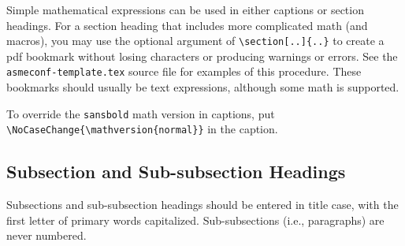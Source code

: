 \documentclass[balance,upint,subscriptcorrection,varvw,mathalfa=cal=boondoxo,spanish,french,vietnamese,russian,greek,pdf-a,colorlinks]{asmeconf}
\begin{document}
Simple mathematical expressions can be used in either captions or section headings. For a section heading that includes more complicated math (and macros), you may use the optional argument of \verb|\section[..]{..}| to create a pdf bookmark without losing characters or producing warnings or errors. See the \texttt{asmeconf-template.tex} source file for examples of this procedure. These bookmarks should usually be text expressions, although some math is supported.  

To override the \texttt{sansbold} math version in captions, put \verb|\NoCaseChange{\mathversion{normal}}| in the caption.

\subsection{Subsection and Sub-subsection Headings}

Subsections and sub-subsection headings should be entered in title case, with the first letter of primary words capitalized. Sub-subsections (i.e., paragraphs) are never numbered.




\begin{table}[t]
\caption[Table]{A simple table}\label{tab:1}
\end{table}


\end{document}
